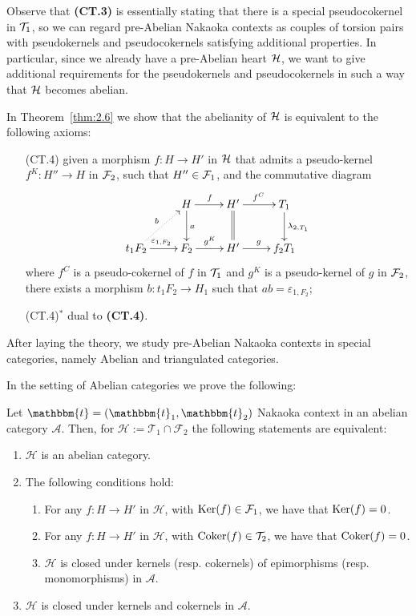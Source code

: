 Observe that \textbf{(CT.3)} is essentially stating that there is a special pseudocokernel in $\mathcal{T}_1$, so we can regard pre-Abelian Nakaoka contexts as couples of torsion pairs with pseudokernels and pseudocokernels satisfying additional properties. In particular, since we already have a pre-Abelian heart $\mathcal{H}$, we want to give additional requirements for the pseudokernels and pseudocokernels in such a way that $\mathcal{H}$ becomes abelian.

In Theorem~\ref{thm:2.6} we show that the abelianity of $\mathcal{H}$ is equivalent to the following axioms:
\begin{enumerate}
  \item[(CT.4)] given a morphism $f\colon H\to H'$ in $\mathcal{H}$ that admits a pseudo-kernel $f^K\colon H''\to H$ in $\mathcal{F}_2$, such that $H''\in \mathcal{F}_1$, and the commutative diagram
    \begin{equation*}
      \xymatrix{
        & H\ar[d]^{a}\ar[r]^{f} & H'\ar@{=}[d]\ar[r]^{f^C} & T_1\ar[d]^{\lambda_{2,T_1}}\\
        t_1F_2\ar@{.>}[ur]^{b}\ar[r]^{\varepsilon_{1,F_2}} & F_2\ar[r]^{g^K} & H'\ar[r]^{g} & f_2T_1
      }
    \end{equation*}
    where $f^C$  is a pseudo-cokernel of $f$ in $\mathcal{T}_1$ and $g^K$ is a pseudo-kernel of $g$ in $\mathcal{F}_2$, there exists a morphism $b\colon t_1F_2\to H_1$ such that $ab=\varepsilon_{1,F_2}$;
  \item[(CT.4)$^\ast$] dual to \textbf{(CT.4)}.
\end{enumerate}

After laying the theory, we study pre-Abelian Nakaoka contexts in special categories, namely Abelian and triangulated categories.

In the setting of Abelian categories we prove the following:

\begin{nonlisting_thm}[\ref{thm_2_4}]
  Let $\mathbbm{t}=(\mathbbm{t}_1,\mathbbm{t}_2)$ Nakaoka context in an abelian category
  $\mathscr{A}$. Then, for
  $\mathcal{H}:=\mathcal{T}_1\cap\mathcal{F}_2$ the following statements are equivalent:
  \begin{enumerate}[label=(\alph*)]
    \item $\mathcal{H}$ is an abelian category.
    \item The following conditions hold:
      \begin{enumerate}[label=(\alph{enumi}\arabic*)]
        \item For any $f:H\to H'$ in $\mathcal{H}$, with $\operatorname{Ker}(f)\in\mathcal{F}_1$,
        we have that $\operatorname{Ker}(f)=0$.
        \item For any $f:H\to H'$ in $\mathcal{H}$, with $\operatorname{Coker}(f)\in\mathcal{T}_2$,
        we have that $\operatorname{Coker}(f)=0$.
        \item $\mathcal{H}$ is closed under kernels (resp. cokernels) of epimorphisms
        (resp. monomorphisms) in $\mathscr{A}$.
      \end{enumerate}
    \item $\mathcal{H}$ is closed under kernels and cokernels in $\mathscr{A}$.
  \end{enumerate}
\end{nonlisting_thm}


